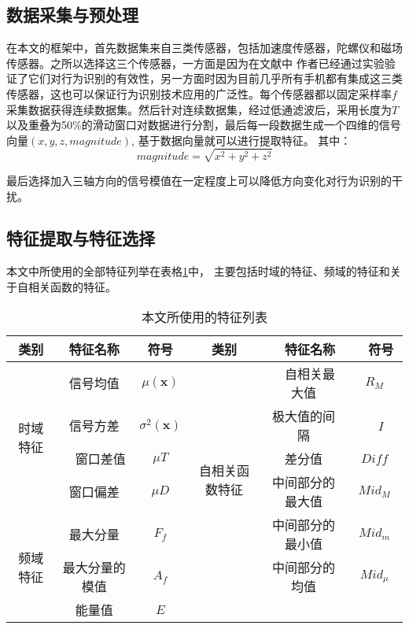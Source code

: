 \subsection{数据采集与预处理}
\par 在本文的框架中，首先数据集来自三类传感器，包括加速度传感器，陀螺仪和磁场传感器。之所以选择这三个传感器，一方面是因为在文献\cite{diffSensors}中 作者已经通过实验验证了它们对行为识别的有效性，另一方面时因为目前几乎所有手机都有集成这三类传感器，这也可以保证行为识别技术应用的广泛性。每个传感器都以固定采样率$f$采集数据获得连续数据集。然后针对连续数据集，经过低通滤波后，采用长度为$T$以及重叠为50\%的滑动窗口对数据进行分割，最后每一段数据生成一个四维的信号向量$(x, y, z, magnitude)$, 基于数据向量就可以进行提取特征。 其中：
\begin{equation}
	magnitude = \sqrt{x^2+y^2+z^2}
\end{equation}
\par 最后选择加入三轴方向的信号模值在一定程度上可以降低方向变化对行为识别的干扰。

\subsection{特征提取与特征选择}
本文中所使用的全部特征列举在表格\ref{feature_list}中， 主要包括时域的特征、频域的特征和关于自相关函数的特征。

\begin{table}[!htb]
    \caption{本文所使用的特征列表} \label{feature_list}
    \begin{tabular}{|c|c|c|c|c|c|}
    \hline
    类别 & 特征名称 & 符号 & 类别 &　特征名称　&　符号　\\
    \hline
    \multirow{4}{*}{时域特征} & 信号均值　& $\mu (\textbf{x})$ & \multirow{6}{1cm}{自相关函数特征}　&　自相关最大值 & $R_M$ \\
    \cline{2-3} \cline{5-6}
    & 信号方差　& $\sigma ^2 (\textbf{x})$ & & 极大值的间隔　&　$I$  \\
    \cline{2-3} \cline{5-6}
    &　窗口差值 & $\mu T$ & & 差分值 & $Diff$ \\
    \cline{2-3} \cline{5-6}
    & 窗口偏差 & $\mu D$ & & 中间部分的最大值 & $Mid_M$ \\
    \cline{1-3} \cline{5-6}
    \multirow{3}{*}{频域特征} & 最大分量 & $F_f$ & & 中间部分的最小值 & $Mid_m$ \\
    \cline{2-3} \cline{5-6}
    & 最大分量的模值 & $A_f$ & & 中间部分的均值 & $Mid_{\mu}$ \\
    \cline{2-6}
    & 能量值 & $E$ & & & \\
    \hline
    \end{tabular}
\end{table}


